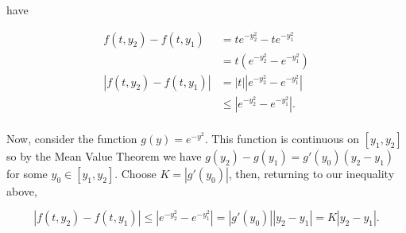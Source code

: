 \documentclass[11pt,oneside,english]{amsart}
\theoremstyle{definition}
\begin{document}
\begin{enumerate}
\begin{enumerate}
have

\vspace{-5mm}
\begin{align*}
f(t,y_2)-f(t,y_1)&=te^{-y_2^2}-te^{-y_1^2}\\[2mm]
&=t\left(e^{-y_2^2}-e^{-y_1^2}\right)\\[2mm]
|f(t,y_2)-f(t,y_1)|&=|t|\left|e^{-y_2^2}-e^{-y_1^2}\right|\\[2mm]
&\leq\left|e^{-y_2^2}-e^{-y_1^2}\right|.\\[2mm]
\end{align*}

\vspace{-5mm}
Now, consider the function $g(y)=e^{-y^2}$. This function is continuous on $[y_1,y_2]$ so by the Mean Value Theorem we have $g(y_2)-g(y_1)=g'(y_0)(y_2-y_1)$ for some $y_0\in[y_1,y_2]$. Choose $K=|g'(y_0)|$, then, returning to our inequality above,

\[
|f(t,y_2)-f(t,y_1)|\leq\left|e^{-y_2^2}-e^{-y_1^2}\right|=|g'(y_0)||y_2-y_1|=K|y_2-y_1|.
\]
\end{enumerate}

\end{enumerate}
\end{document}
